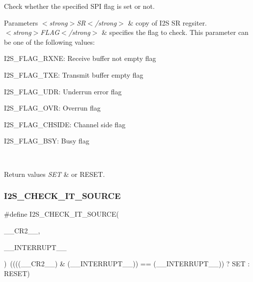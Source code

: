 Check whether the specified S\+PI flag is set or not. 


\begin{DoxyParams}{Parameters}
{\em $<$strong$>$\+S\+R$<$/strong$>$} & copy of I2S SR regsiter. \\
\hline
{\em $<$strong$>$\+F\+L\+A\+G$<$/strong$>$} & specifies the flag to check. This parameter can be one of the following values\+: \begin{DoxyItemize}
\item I2\+S\+\_\+\+F\+L\+A\+G\+\_\+\+R\+X\+NE\+: Receive buffer not empty flag \item I2\+S\+\_\+\+F\+L\+A\+G\+\_\+\+T\+XE\+: Transmit buffer empty flag \item I2\+S\+\_\+\+F\+L\+A\+G\+\_\+\+U\+DR\+: Underrun error flag \item I2\+S\+\_\+\+F\+L\+A\+G\+\_\+\+O\+VR\+: Overrun flag \item I2\+S\+\_\+\+F\+L\+A\+G\+\_\+\+C\+H\+S\+I\+DE\+: Channel side flag \item I2\+S\+\_\+\+F\+L\+A\+G\+\_\+\+B\+SY\+: Busy flag \end{DoxyItemize}
\\
\hline
\end{DoxyParams}

\begin{DoxyRetVals}{Return values}
{\em S\+ET} & or R\+E\+S\+ET. \\
\hline
\end{DoxyRetVals}
\mbox{\label{group___i2_s___private___macros_gadee8d9ff836a0f9328f961c1109f3961}} 
\subsubsection{\texorpdfstring{I2\+S\+\_\+\+C\+H\+E\+C\+K\+\_\+\+I\+T\+\_\+\+S\+O\+U\+R\+CE}{I2S\_CHECK\_IT\_SOURCE}}
{\footnotesize\ttfamily \#define I2\+S\+\_\+\+C\+H\+E\+C\+K\+\_\+\+I\+T\+\_\+\+S\+O\+U\+R\+CE(\begin{DoxyParamCaption}\item[{}]{\+\_\+\+\_\+\+C\+R2\+\_\+\+\_\+,  }\item[{}]{\+\_\+\+\_\+\+I\+N\+T\+E\+R\+R\+U\+P\+T\+\_\+\+\_\+ }\end{DoxyParamCaption})~((((\+\_\+\+\_\+\+C\+R2\+\_\+\+\_\+) \& (\+\_\+\+\_\+\+I\+N\+T\+E\+R\+R\+U\+P\+T\+\_\+\+\_\+)) == (\+\_\+\+\_\+\+I\+N\+T\+E\+R\+R\+U\+P\+T\+\_\+\+\_\+)) ? S\+ET \+: R\+E\+S\+ET)}



